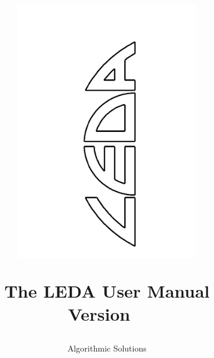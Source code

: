 

\title {
        \centerline{\hbox{\includegraphics[angle=-90,width=8cm]{logo}}}
        \vspace{1.0cm}
        The LEDA User Manual\\[1cm]
        Version \ledaversion\
}

\author{Algorithmic Solutions}

